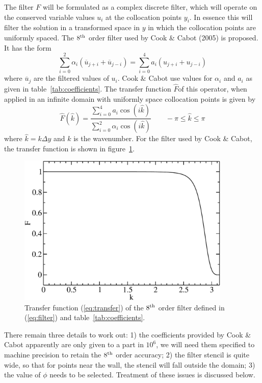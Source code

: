 \documentclass[11pt]{article}%
\begin{document}
The filter $F$ will be formulated as a complex discrete filter, which
will operate on the conserved variable values $u_i$ at the collocation
points $y_i$. In essence this will filter the solution in a transformed
space in $y$ in which the collocation points are uniformly spaced. The
$8^{\rm th}$ order filter used by Cook \& Cabot (2005) is proposed. It
has the form
\begin{equation}
\sum_{i=0}^2 \alpha_i(\overline u_{j+i} + \overline u_{j-i}) = \sum_{i=0}^4
 a_i(u_{j+i}+u_{j-i})
\label{eq:filter}
\end{equation}
where $\overline u_j$ are the filtered values of $u_i$. Cook \& Cabot use
values for $\alpha_i$ and $a_i$ as given in table~\ref{tab:coefficients}. The transfer
function $\hat F$of this operator, when applied in an infinite domain with
uniformly space collocation points is given by
\begin{equation}
\hat F(\hat k)=\frac{\sum_{i=0}^4a_i\cos(i\hat
 k)}{\sum_{i=0}^2\alpha_i\cos(i\hat k)}\qquad -\pi\leq\hat k\leq\pi
\label{eq:transfer}
\end{equation}
where $\hat k=k\Delta y$ and $k$ is the wavenumber. For the filter used
by Cook \& Cabot, the transfer function is shown in figure~\ref{fig:transfer}.

\begin{figure}[t]
\begin{center}
\includegraphics[width=4in]{figs/transfer_function.pdf}
\end{center}
 \caption{Transfer function (\ref{eq:transfer}) of the $8^{\rm th}$ order filter defined in
 (\ref{eq:filter}) and table~\ref{tab:coefficients}.}
\label{fig:transfer}
\end{figure}

There remain three details to work out: 1) the coefficients provided by
Cook \& Cabot apparently are only given to a part in $10^6$, we will
need them specified to machine precision to retain the $8^{\rm th}$
order accuracy; 2) the filter stencil is quite wide, so that for points
near the wall, the stencil will fall outside the domain; 3) the value of
$\phi$ needs to be selected. Treatment of
these issues is discussed below.
\end{document}
